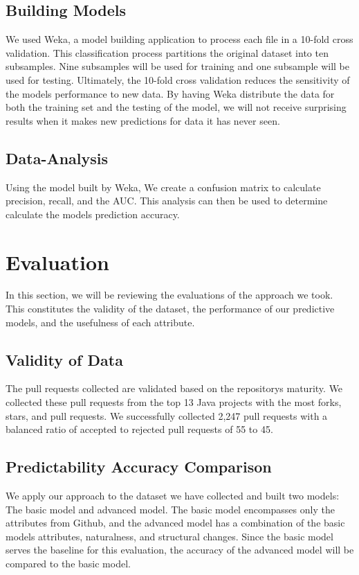 \documentclass[10pt, conference]{IEEEtran}
\begin{document}
\subsection{Building Models}
We used Weka, a model building application to process each file in a 10-fold cross validation. This classification process partitions the original dataset into ten subsamples. Nine subsamples will be used for training and one subsample will be used for testing. Ultimately, the 10-fold cross validation reduces the sensitivity of the model\textquotesingle s performance to new data. By having Weka distribute the data for both the training set and the testing of the model, we will not receive surprising results when it makes new predictions for data it has never seen.

\subsection{Data-Analysis}
Using the model built by Weka, We create a confusion matrix to calculate precision, recall, and the AUC. This analysis can then be used to determine calculate the model\textquotesingle s prediction accuracy.

\section{Evaluation}
\label{evaluation}
In this section, we will be reviewing the evaluations of the approach we took. This constitutes the validity of the dataset, the performance of our predictive models, and the usefulness of each attribute.

\subsection{Validity of Data}
The pull requests collected are validated based on the repository\textquotesingle s maturity. We collected these pull requests from the top 13 Java projects with the most forks, stars, and pull requests. We successfully collected 2,247 pull requests with a balanced ratio of accepted to rejected pull requests of 55 to 45.

\subsection{Predictability Accuracy Comparison}
We apply our approach to the dataset we have collected and built two models: The basic model and advanced model. The basic model encompasses only the attributes from Github, and the advanced model has a combination of the basic model\textquotesingle s attributes, naturalness, and structural changes. Since the basic model serves the baseline for this evaluation, the accuracy of the advanced model will be compared to the basic model. 
\end{document}
